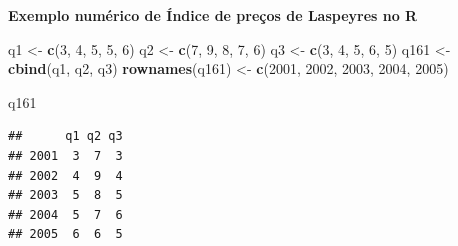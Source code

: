 \documentclass[
]{book}
\newenvironment{Shaded}{\begin{snugshade}}{\end{snugshade}}
\newcommand{\DecValTok}[1]{\textcolor[rgb]{0.00,0.00,0.81}{#1}}
\newcommand{\KeywordTok}[1]{\textcolor[rgb]{0.13,0.29,0.53}{\textbf{#1}}}
\newcommand{\NormalTok}[1]{#1}
\newcommand{\StringTok}[1]{\textcolor[rgb]{0.31,0.60,0.02}{#1}}
\begin{document}
\textbf{Exemplo numérico de Índice de preços de Laspeyres no R}

\begin{Shaded}
\begin{Highlighting}[]
\NormalTok{q1 <-}\StringTok{ }\KeywordTok{c}\NormalTok{(}\DecValTok{3}\NormalTok{, }\DecValTok{4}\NormalTok{, }\DecValTok{5}\NormalTok{, }\DecValTok{5}\NormalTok{, }\DecValTok{6}\NormalTok{)}
\NormalTok{q2 <-}\StringTok{ }\KeywordTok{c}\NormalTok{(}\DecValTok{7}\NormalTok{, }\DecValTok{9}\NormalTok{, }\DecValTok{8}\NormalTok{, }\DecValTok{7}\NormalTok{, }\DecValTok{6}\NormalTok{)}
\NormalTok{q3 <-}\StringTok{ }\KeywordTok{c}\NormalTok{(}\DecValTok{3}\NormalTok{, }\DecValTok{4}\NormalTok{, }\DecValTok{5}\NormalTok{, }\DecValTok{6}\NormalTok{, }\DecValTok{5}\NormalTok{)}
\NormalTok{q161 <-}\StringTok{ }\KeywordTok{cbind}\NormalTok{(q1, q2, q3)}
\KeywordTok{rownames}\NormalTok{(q161) <-}\StringTok{ }\KeywordTok{c}\NormalTok{(}\DecValTok{2001}\NormalTok{, }\DecValTok{2002}\NormalTok{, }\DecValTok{2003}\NormalTok{, }\DecValTok{2004}\NormalTok{, }\DecValTok{2005}\NormalTok{)}

\NormalTok{q161}
\end{Highlighting}
\end{Shaded}

\begin{verbatim}
##      q1 q2 q3
## 2001  3  7  3
## 2002  4  9  4
## 2003  5  8  5
## 2004  5  7  6
## 2005  6  6  5
\end{verbatim}
\end{document}
